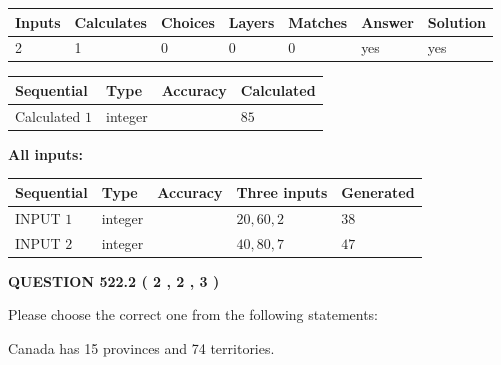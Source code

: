\documentclass[12pt]{article}
\begin{document}
 

 
   
   
   
   
\noindent\begin{tabular}{|l|l|l|l|l|l|l|}
 \hline
Inputs & Calculates & Choices & Layers & Matches & Answer & Solution \\ \hline
 2  & 
 1  & 
 0
  & 
 0  & 
 0  & 
  yes & 
  yes 
  \\ \hline
 \end{tabular}
   
   
   
   
\noindent{}
   
   
  
  
\noindent\begin{tabular}{|l|l|l|l|}
\hline
 Sequential & Type & Accuracy & Calculated \\ 
\hline
 
 
  Calculated $  1 $ & integer &  & 
  $ 85 $ 
 \\  \hline  
 \end{tabular}
   
   
   
   
\noindent\vspace{0.1in}\hspace{-0.08in} {\textbf{\Large{All inputs: }}}
   
   
  
  
\noindent\begin{tabular}{|l|l|l|l|l|}
\hline
 Sequential & Type & Accuracy & Three inputs & Generated \\ 
\hline
 
 
  INPUT $  1 $ & integer &  & $
 20
 , 
 60
 , 
 2
 $ & $ 38 $ 
 \\  \hline  
 
 
  INPUT $  2 $ & integer &  & $
 40
 , 
 80
 , 
 7
 $ & $ 47 $ 
 \\  \hline  
 \end{tabular}
   
   
  
\vspace{0.2in}
  
{\textbf{\Large{QUESTION
522.2 
 ( 2 , 2 , 3 )
}}}
  
  
Please choose the correct one from the following statements:
 
 
Canada has  15 provinces and  74 territories.
 
\end{document}
